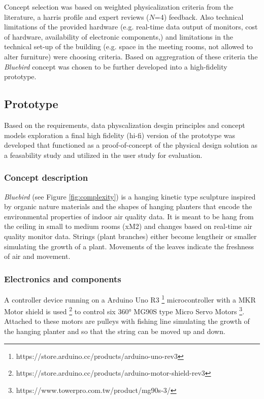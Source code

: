 Concept selection was based on weighted physicalization criteria from the literature, a harris profile  and expert reviews ($N$=4) feedback. Also technical limitations of the provided hardware (e.g. real-time data output of monitors, cost of hardware, availability of electronic components,) and limitations in the technical set-up of the building (e.g. space in the meeting rooms, not allowed to alter furniture) were choosing criteria. Based on aggregration of these criteria the \textit{Bluebird} concept was chosen to be further developed into a high-fidelity prototype.


\subsection{Prototype}

Based on the requirements, data physcalization desgin principles and concept models exploration a final high fidelity (hi-fi) version of the prototype was developed that functioned as a proof-of-concept of the physical design solution as a feasability study and utilized in the user study for evaluation.



\subsubsection{Concept description}

\textit{Bluebird} (see Figure \ref{fig:complexity}) is a hanging kinetic type sculpture inspired by organic nature materials and the shapes of hanging planters that encode the environmental properties of indoor air quality data. It is meant to be hang from the ceiling in small to medium rooms (xM2) and changes based on real-time air quality monitor data. Strings (plant branches) either become lengtheir or smaller simulating the growth of a plant. Movements of the leaves indicate the freshness of air and movement.

\subsubsection{Electronics and components}

A controller device running on a Arduino Uno R3 \footnote{https://store.arduino.cc/products/arduino-uno-rev3} microcontroller with a MKR Motor shield is used \footnote{https://store.arduino.cc/products/arduino-motor-shield-rev3} to control six 360° MG90S type Micro Servo Motors \footnote{https://www.towerpro.com.tw/product/mg90s-3/}. Attached to these motors are pulleys with fishing line simulating the growth of the hanging planter and so that the string can be moved up and down.


